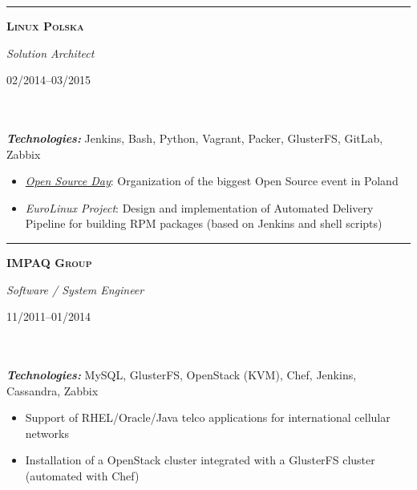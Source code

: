 \documentclass[$fontsize$, a4paper]{article}
\newcommand\textbox[1]{%
  \parbox{.333\textwidth}{#1}%
}
\begin{document}
\noindent\rule[0.5ex]{\linewidth}{1pt}

\noindent\textbox{\textbf{\textsc{Linux Polska}}\hfill}\textbox{\hfil \emph{Solution Architect}\hfil}\textbox{\hfill 02/2014--03/2015}\\\\
\textbf{\textit{Technologies:}} Jenkins, Bash, Python, Vagrant, Packer, GlusterFS, GitLab, Zabbix

\vspace{1pt}
\begin{itemize}
  \setlength\itemsep{-0.2em}
  \item \emph{\href{http://opensourceday.com/}{Open Source Day}}: Organization of the biggest Open Source event in Poland
  \item \emph{EuroLinux Project}: Design and implementation of Automated Delivery Pipeline for building RPM packages (based on Jenkins and shell scripts)
\end{itemize}


\noindent\rule[0.5ex]{\linewidth}{1pt}

\noindent\textbox{\textbf{\textsc{IMPAQ Group}}\hfill}\textbox{\hfil \emph{Software / System Engineer}\hfil}\textbox{\hfill 11/2011--01/2014}\\\\
\textbf{\textit{Technologies:}} MySQL, GlusterFS, OpenStack (KVM), Chef, Jenkins, Cassandra, Zabbix

\vspace{1pt}
\begin{itemize}
  \setlength\itemsep{-0.2em}
  \item Support of RHEL/Oracle/Java telco applications for international cellular networks
  \item Installation of a OpenStack cluster integrated with a GlusterFS cluster (automated with Chef)
\end{itemize}


\end{document}
